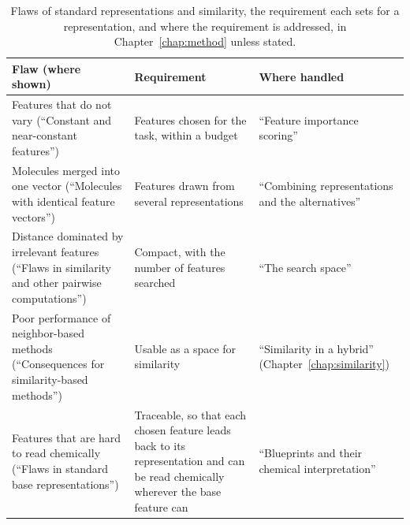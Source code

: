 \begin{table}[htbp]
\centering
\small
\begin{adjustbox}{max width=\textwidth,max totalheight=0.78\textheight}
\begin{tabular}{P{0.34\textwidth}P{0.30\textwidth}P{0.28\textwidth}}
\toprule
Flaw (where shown) & Requirement & Where handled \\
\midrule
Features that do not vary (``Constant and near-constant features'') & Features chosen for the task, within a budget & ``Feature importance scoring'' \\
Molecules merged into one vector (``Molecules with identical feature vectors'') & Features drawn from several representations & ``Combining representations and the alternatives'' \\
Distance dominated by irrelevant features (``Flaws in similarity and other pairwise computations'') & Compact, with the number of features searched & ``The search space'' \\
Poor performance of neighbor-based methods (``Consequences for similarity-based methods'') & Usable as a space for similarity & ``Similarity in a hybrid'' (Chapter~\ref{chap:similarity}) \\
Features that are hard to read chemically (``Flaws in standard base representations'') & Traceable, so that each chosen feature leads back to its representation and can be read chemically wherever the base feature can & ``Blueprints and their chemical interpretation'' \\
\bottomrule
\end{tabular}
\end{adjustbox}
\caption[Flaws of standard representations and similarity, and the requirement each sets.]{Flaws of standard representations and similarity, the requirement each sets for a representation, and where the requirement is addressed, in Chapter~\ref{chap:method} unless stated.}
\label{tab:flaws:requirements}
\end{table}


